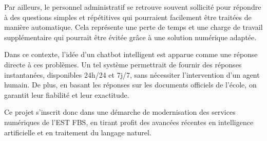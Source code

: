 \documentclass[12pt,a4paper]{report}
\begin{document}
Par ailleurs, le personnel administratif se retrouve souvent sollicité pour répondre à des questions simples et répétitives qui pourraient facilement être traitées de manière \newline automatique. Cela représente une perte de temps et une charge de travail supplémentaire qui pourrait être évitée grâce à une solution numérique adaptée.
\newline

Dans ce contexte, l'idée d'un chatbot intelligent est apparue comme une réponse \newline directe à ces problèmes. Un tel système permettrait de fournir des réponses instantanées, disponibles 24h/24 et 7j/7, sans nécessiter l'intervention d'un agent humain. De plus, en basant les réponses sur les documents officiels de l'école, on garantit leur fiabilité et leur exactitude.
\newline

Ce projet s'inscrit donc dans une démarche de modernisation des services numériques de l'EST FBS, en tirant profit des avancées récentes en intelligence artificielle et en \newline traitement du langage naturel. \newpage
\end{document}
